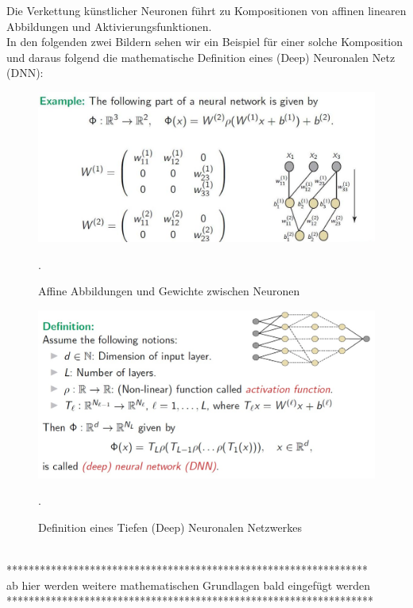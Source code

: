 \documentclass[12pt]{article}
\begin{document}
Die Verkettung künstlicher Neuronen führt zu Kompositionen von affinen linearen Abbildungen und Aktivierungsfunktionen.\\
In den folgenden zwei Bildern sehen wir ein Beispiel für einer solche Komposition und daraus folgend die mathematische Definition eines (Deep) Neuronalen Netz (DNN): 
\begin{figure}[ht]
  \centering
  \hspace*{-0.5cm} 
  \includegraphics[width=1.15\textwidth]{Mapping+Weights}
  \caption{Affine Abbildungen und Gewichte zwischen Neuronen}.\\[0.2cm]      
  \label{fig:Map+Weights}
\end{figure}
%
\begin{figure}[ht]
  \centering
  \hspace*{-0.2cm} 
  \includegraphics[width=1.1\textwidth]{Definition-Deep-NN}
  \caption{Definition eines Tiefen (Deep) Neuronalen Netzwerkes}.\\[0.2cm]      
  \label{fig:def-DNN}
\end{figure}\\
%
\newpage
%
{\color{red} {*****************************************************************\\
ab hier werden weitere mathematischen Grundlagen bald eingefügt werden\\
******************************************************************}}
%
\end{document}
